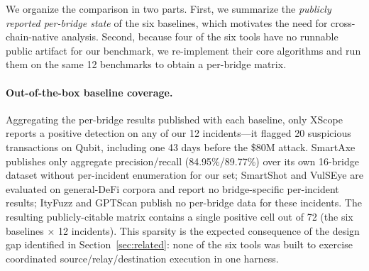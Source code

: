 \documentclass[journal]{IEEEtran}
\begin{document}
We organize the comparison in two parts. First, we summarize the \emph{publicly reported per-bridge state} of the six baselines, which motivates the need for cross-chain-native analysis. Second, because four of the six tools have no runnable public artifact for our benchmark, we re-implement their core algorithms and run them on the same 12 benchmarks to obtain a per-bridge matrix.

\paragraph{Out-of-the-box baseline coverage.}
Aggregating the per-bridge results published with each baseline, only XScope reports a positive detection on any of our 12 incidents---it flagged 20 suspicious transactions on Qubit, including one 43 days before the \$80M attack. SmartAxe publishes only aggregate precision/recall (84.95\%/89.77\%) over its own 16-bridge dataset without per-incident enumeration for our set; SmartShot and VulSEye are evaluated on general-DeFi corpora and report no bridge-specific per-incident results; ItyFuzz and GPTScan publish no per-bridge data for these incidents. The resulting publicly-citable matrix contains a single positive cell out of 72 (the six baselines $\times$ 12 incidents). This sparsity is the expected consequence of the design gap identified in Section~\ref{sec:related}: none of the six tools was built to exercise coordinated source/relay/destination execution in one harness.
\end{document}
